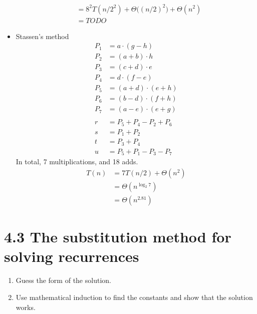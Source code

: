 \documentclass[a4paper]{article}
\theoremstyle{plain}
\begin{document}
\begin{itemize}
\begin{align*}
  & = 8^2T(n/{2^2}) + \Theta\bigl((n/2)^2\bigr) + \Theta(n^2) \\
  & = TODO
    \end{align*}
    \item Stassen’s method
    \begin{align*}
  P_1 &= a \cdot (g-h)\\
  P_2 &= (a+b) \cdot h\\
  P_3 &= (c+d) \cdot e\\
  P_4 &= d \cdot (f-e)\\
  P_5 &= (a+d)\cdot (e+h)\\
  P_6 &= (b-d) \cdot (f+h)\\
  P_7 &= (a-e) \cdot (e+g)\\
  &\\
  r&=P_5+P_4-P_2+P_6\\
  s&=P_1+P_2\\
  t&=P_3+P_4\\
  u&=P_5+P_1-P_3-P_7
  \end{align*}
  In total, 7 multiplications, and 18 adds.
  \begin{align*}
  T(n) & = 7T(n/2) + \Theta(n^2) \\
  & = \Theta(n^{\log_2{7}}) \\ 
  & = \Theta(n^{2.81})
  \end{align*}
\end{itemize}
\section*{4.3 The substitution method for solving recurrences}
\begin{enumerate}
    \item Guess the form of the solution.
    \item Use mathematical induction to find the constants and show that the solution works.
\end{enumerate}
\end{document}
